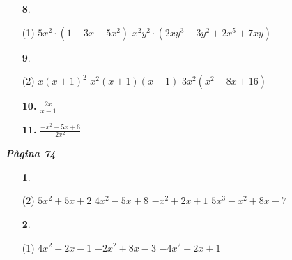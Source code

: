 \documentclass[a4paper, pdf, twoside]{book}
\begin{document}
\begin{multicols}{2}
\begin{enumerate}

 \item[\fontfamily{phv}\selectfont\color{blue}\textbf{8}. ]  \scalebox{0.6}{\simbolclau } 
 \begin{tasks}[column-sep=1em, item-indent=1.3333em](1)
	 \task $5x^2 \cdot (1-3x+5x^2)$
	 \task* $x^2 y^2 \cdot (2 xy^3 - 3y^2 + 2 x^5 + 7xy)$
\end{tasks}
\vspace{0.25cm}



 \item[\fontfamily{phv}\selectfont\color{blue}\textbf{9}. ]  \scalebox{0.6}{\simbolclau } 
 \begin{tasks}[column-sep=1em, item-indent=1.3333em](2)
	 \task $x (x+1)^2$
	 \task $x^2 (x+1)(x-1)$
	 \task $3x^2 (x^2-8x+16)$
\end{tasks}
\vspace{0.25cm}
\item[\fontfamily{phv}\selectfont\color{blue}\textbf{10. }]  \scalebox{0.6}{\simbolclau } 
$\frac {2x}{x-1}$
\vspace{0.25cm}
\item[\fontfamily{phv}\selectfont\color{blue}\textbf{11. }]  \scalebox{0.6}{\simbolclau } 
$\frac {-x^2-5x+6}{2x^2}$
 \end{enumerate}
\vspace{0.3cm}


{\textbf{\em Pàgina 74}} \hrulefill
\begin{enumerate}
\vspace{0.25cm}



 \item[\fontfamily{phv}\selectfont\color{blue}\textbf{1}. ] 
 \begin{tasks}[column-sep=1em, item-indent=1.3333em](2)
	 \task $5x^2+5x+2$
	 \task $4x^2-5x+8$
	 \task $-x^2+2x+1$
	 \task $5x^3-x^2+8x-7$
\end{tasks}
 \end{enumerate}
\begin{enumerate}
\vspace{0.25cm}



 \item[\fontfamily{phv}\selectfont\color{blue}\textbf{2}. ] 
 \begin{tasks}[column-sep=1em, item-indent=1.3333em](1)
	 \task $4x^2-2x-1$
	 \task $-2x^2+8x-3$
	 \task $-4x^2+2x+1$
\end{tasks}
\vspace{0.25cm}



\end{enumerate}
\end{multicols}
\end{document}
